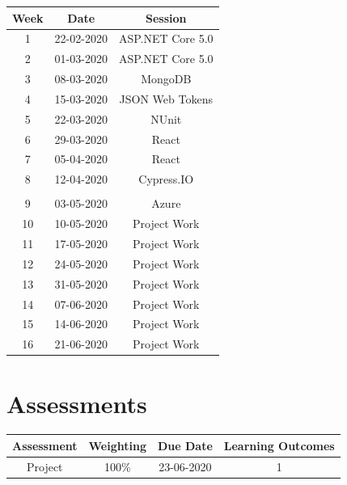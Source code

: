 \documentclass{article}
\begin{document}
\renewcommand{\arraystretch}{1.5}
\begin{tabular}{|c|c|c|c|}
	\hline
	\textbf{Week} & \textbf{Date}     & \multicolumn{2}{c|}{\textbf{Session}}        \\ \hline
	\small 1      & \small 22-02-2020 & \multicolumn{2}{c|}{\small ASP.NET Core 5.0} \\ \hline
	\small 2      & \small 01-03-2020 & \multicolumn{2}{c|}{\small ASP.NET Core 5.0} \\ \hline
	\small 3      & \small 08-03-2020 & \multicolumn{2}{c|}{\small MongoDB}          \\ \hline
	\small 4      & \small 15-03-2020 & \multicolumn{2}{c|}{\small JSON Web Tokens}  \\ \hline
	\small 5      & \small 22-03-2020 & \multicolumn{2}{c|}{\small NUnit}            \\ \hline
	\small 6      & \small 29-03-2020 & \multicolumn{2}{c|}{\small React}            \\ \hline
	\small 7      & \small 05-04-2020 & \multicolumn{2}{c|}{\small React}            \\ \hline
	\small 8      & \small 12-04-2020 & \multicolumn{2}{c|}{\small Cypress.IO}       \\ \hline
	\rowcolor{yellow} \multicolumn{4}{|c|}{\small Mid Term Break}  \\ \hline
	\small 9      & \small 03-05-2020 & \multicolumn{2}{c|}{\small Azure}            \\ \hline
	\small 10     & \small 10-05-2020 & \multicolumn{2}{c|}{\small Project Work}     \\ \hline
	\small 11     & \small 17-05-2020 & \multicolumn{2}{c|}{\small Project Work}     \\ \hline
	\small 12     & \small 24-05-2020 & \multicolumn{2}{c|}{\small Project Work}     \\ \hline
	\small 13     & \small 31-05-2020 & \multicolumn{2}{c|}{\small Project Work}     \\ \hline
	\small 14     & \small 07-06-2020 & \multicolumn{2}{c|}{\small Project Work}     \\ \hline
	\small 15     & \small 14-06-2020 & \multicolumn{2}{c|}{\small Project Work}     \\ \hline
	\small 16     & \small 21-06-2020 & \multicolumn{2}{c|}{\small Project Work}     \\ \hline
\end{tabular}

\section*{Assessments}
\renewcommand{\arraystretch}{1.5}
\begin{tabular}{|c|c|c|c|}
	\hline
	\textbf{Assessment}                                & \textbf{Weighting} & \textbf{Due Date} & \textbf{Learning Outcomes} \\ \hline 
	\small Project                       & \small 100\%        & \small 23-06-2020 & \small 1                   \\ \hline
\end{tabular}
\end{document}
